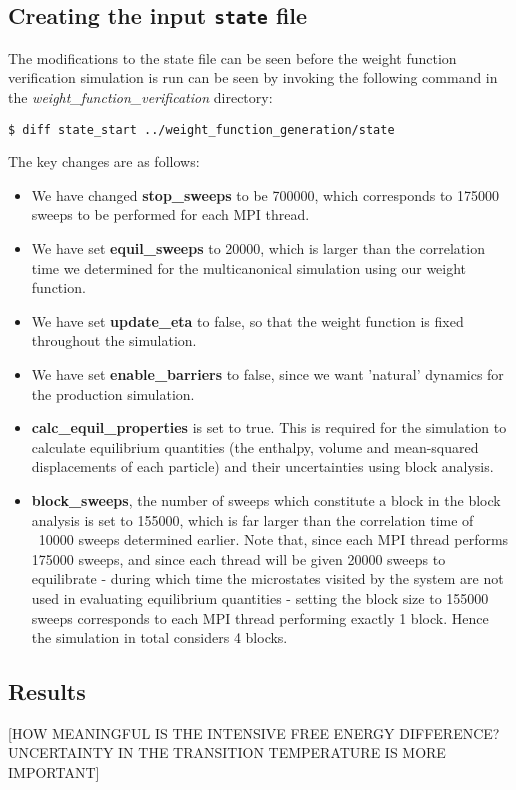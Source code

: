 \documentclass{report}
\begin{document}
\subsection{Creating the input \texttt{state} file}
The modifications to the state file can be seen before the weight function verification simulation is run can be seen by invoking the following command
in the \emph{weight\_function\_verification} directory:
\begin{verbatim}
$ diff state_start ../weight_function_generation/state
\end{verbatim}
The key changes are as follows:
\begin{itemize}
\item We have changed \textbf{stop\_sweeps} to be 700000, which corresponds to 175000 sweeps to be performed for each MPI thread.
\item We have set \textbf{equil\_sweeps} to 20000, which is larger than the correlation time we determined for the multicanonical simulation using our 
weight function.
\item We have set \textbf{update\_eta} to false, so that the weight function is fixed throughout the simulation.
\item We have set \textbf{enable\_barriers} to false, since we want 'natural' dynamics for the production simulation.
\item \textbf{calc\_equil\_properties} is set to true. This is required for the simulation to calculate equilibrium quantities (the enthalpy, volume and 
mean-squared displacements of each particle) and their uncertainties using block analysis.
\item \textbf{block\_sweeps}, the number of sweeps which constitute a block in the block analysis is set to 155000, which is far larger than the 
correlation time of
  ~10000 sweeps determined earlier. Note that, since each MPI thread performs 175000 sweeps, and since each thread will be given 20000 sweeps to 
  equilibrate - during which time the microstates visited by the system are not used in evaluating equilibrium quantities - setting the block size to 
  155000 sweeps corresponds to each MPI thread performing exactly 1 block. Hence the simulation in total considers 4 blocks.
\end{itemize}

\subsection{Results}
[HOW MEANINGFUL IS THE INTENSIVE FREE ENERGY DIFFERENCE? UNCERTAINTY IN THE TRANSITION TEMPERATURE IS MORE IMPORTANT]
\end{document}
